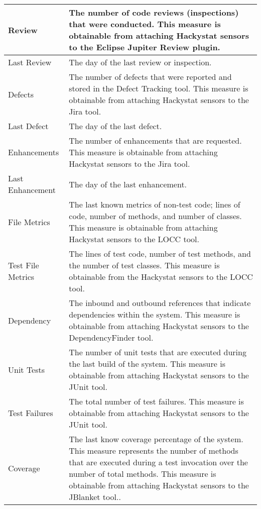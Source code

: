 \begin{table}[htbp]
\begin{center}
\begin{tabular}{|p{3.0cm}|p{10.0cm}|}
\small{}Review & \small{}The number of code reviews (inspections) that were
conducted. This measure is obtainable from attaching Hackystat sensors
to the Eclipse Jupiter Review plugin.\\ \hline
\small{}Last Review & \small{}The day of the last review or inspection. \\ \hline  

\small{}Defects & \small{}The number of defects that were reported and
stored in the Defect Tracking tool. This measure is obtainable from
attaching Hackystat sensors to the Jira tool.\\ \hline
\small{}Last Defect & \small{}The day of the last defect. \\ \hline

\small{}Enhancements & \small{}The number of enhancements that are
requested. This measure is obtainable from attaching Hackystat sensors to
the Jira tool.\\ \hline
\small{}Last Enhancement & \small{}The day of the last enhancement. \\ \hline

\small{}File Metrics & \small{}The last known metrics of non-test code;
lines of code, number of methods, and number of classes. This measure is
obtainable from attaching Hackystat sensors to the LOCC tool. \\ \hline
\small{}Test File Metrics & \small{}The lines of test code, number of test
methods, and the number of test classes. This measure is obtainable from
the Hackystat sensors to the LOCC tool. \\ \hline

\small{}Dependency & \small{}The inbound and outbound references that
indicate dependencies within the system. This measure is obtainable
from attaching Hackystat sensors to the DependencyFinder tool.\\ \hline

\small{}Unit Tests & \small{}The number of unit tests that are executed
during the last build of the system. This measure is obtainable from
attaching Hackystat sensors to the JUnit tool. \\ \hline 

\small{}Test Failures & \small{}The total number of test failures. This
measure is obtainable from attaching Hackystat sensors to the JUnit
tool. \\ \hline

\small{}Coverage & \small{}The last know coverage percentage of the
system. This measure represents the number of methods that are executed
during a test invocation over the number of total methods. This measure is
obtainable from attaching Hackystat sensors to the JBlanket tool.. \\ \hline

    \end{tabular}
  \end{center}
\end{table}

